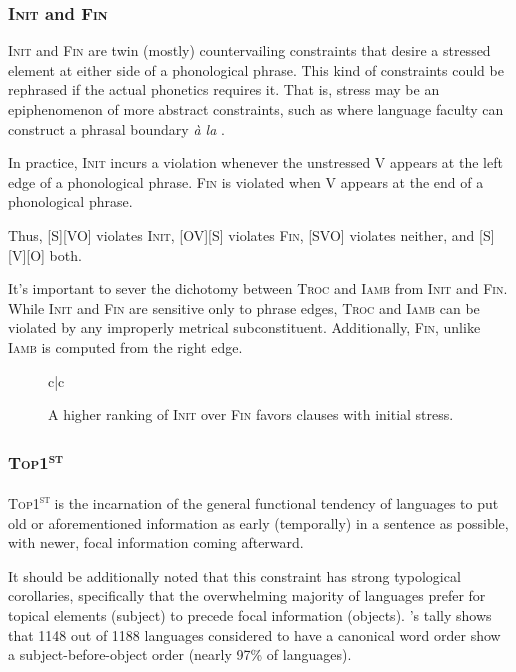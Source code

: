 \documentclass{article}
\newcommand{\iamb}{\textsc{Iamb}}
\newcommand{\topf}{\textsc{Top1\textsuperscript{st}}}
\newcommand{\finphi}{\textsc{Fin\textphi}}
\newcommand{\initphi}{\textsc{Init\textphi}}
\newcommand{\troc}{\textsc{Troc}}
\begin{document}
\subsubsection{{\initphi} and {\finphi}}

{\initphi} and {\finphi} are twin (mostly) countervailing constraints that desire a stressed element at either side of a phonological phrase.
This kind of constraints could be rephrased if the actual phonetics requires it.
That is, stress may be an epiphenomenon of more abstract constraints, such as where language faculty can construct a phrasal boundary \textit{\`a la} \textcite{richards10}.

In practice, {\initphi} incurs a violation whenever the unstressed V appears at the left edge of a phonological phrase.
{\finphi} is violated when V appears at the end of a phonological phrase.

Thus, [S][VO] violates {\initphi}, [OV][S] violates {\finphi}, [SVO] violates neither, and [S][V][O] both.

It's important to sever the dichotomy between {\troc} and {\iamb} from {\initphi} and {\finphi}. While {\initphi} and {\finphi} are sensitive only to phrase edges, {\troc} and {\iamb} can be violated by any improperly metrical subconstituent. Additionally, {\finphi}, unlike {\iamb} is computed from the right edge.


\begin{figure}
\begin{center}
\begin{tableau}{c|c}
		\const{\initphi}	\const{\finphi}
	\cand[\Optimal]{[OV]} \vio{}	\vio{*}
	\cand{[VO]} \vio{*!}	\vio{}
\end{tableau}
\end{center}
	\caption{A higher ranking of {\initphi} over {\finphi} favors clauses with initial stress.}
\end{figure}

\subsubsection{\topf}

{\topf} is the incarnation of the general functional tendency of languages to put old or aforementioned information as early (temporally) in a sentence as possible, with newer, focal information coming afterward.

It should be additionally noted that this constraint has strong typological corollaries, specifically that the overwhelming majority of languages prefer for topical elements (subject) to precede focal information (objects).
\textcite{dryer13}'s tally shows that 1148 out of 1188 languages considered to have a canonical word order show a subject-before-object order (nearly 97\% of languages).
\end{document}
